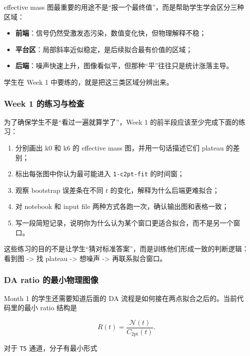 \documentclass[11pt,a4paper,fontset=fandol]{ctexart}
\begin{document}
effective mass 图最重要的用途不是“报一个最终值”，而是帮助学生学会区分三种区域：

\begin{itemize}[leftmargin=2em]
  \item \textbf{前端}：信号仍然受激发态污染，数值变化快，但物理解释不稳；
  \item \textbf{平台区}：局部斜率近似稳定，是后续拟合最有价值的区域；
  \item \textbf{后端}：噪声快速上升，图像看似平，但那种“平”往往只是统计涨落主导。
\end{itemize}

学生在 Week 1 中要练的，就是把这三类区域分辨出来。

\subsubsection{Week 1 的练习与检查}

为了确保学生不是“看过一遍就算学了”，Week 1 的前半段应该至少完成下面的练习：

\begin{enumerate}[leftmargin=2em]
  \item 分别画出 k0 和 k6 的 effective mass 图，并用一句话描述它们 plateau 的差别；
  \item 标出每张图中你认为最可能进入 \lstinline|1-c2pt-fit| 的时间窗；
  \item 观察 bootstrap 误差条在不同 $t$ 的变化，解释为什么后端更难拟合；
  \item 对 notebook 和 input file 两种方式各跑一次，确认输出图和表格一致；
  \item 写一段简短记录，说明你为什么认为某个窗口更适合拟合，而不是另一个窗口。
\end{enumerate}

这些练习的目的不是让学生“猜对标准答案”，而是训练他们形成一致的判断逻辑：看到图 -> 找 plateau -> 想噪声 -> 再联系拟合窗口。

\subsubsection{DA ratio 的最小物理图像}

Month 1 的学生还需要知道后面的 DA 流程是如何接在两点拟合之后的。当前代码里的最小 ratio 结构是

\begin{equation}
R(t) = \frac{\mathcal{N}(t)}{C_{2\mathrm{pt}}(t)}.
\end{equation}

对于 \lstinline|T5| 通道，分子有最小形式
\end{document}
